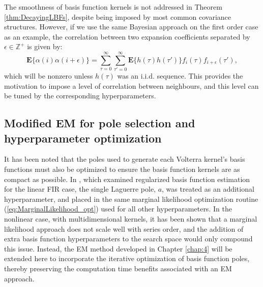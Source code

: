 \begin{rem}
The smoothness of basis function kernels is not addressed in Theorem \ref{thm:DecayingLBFs}, despite being imposed by most common covariance structures. However, if we use the same Bayesian approach on the first order case as an example, the correlation between two expansion coefficients separated by $\epsilon \in \mathbb{Z}^+$ is given by:
$$\textbf{E}\{ \alpha(i) \alpha(i+\epsilon) \} = \sum_{\tau = 0}^{\infty} \sum_{\tau' = 0}^{\infty} \textbf{E}\{h(\tau)h(\tau')\} f_i(\tau) f_{i+\epsilon}(\tau'),$$
which will be nonzero unless $h(\tau)$ was an i.i.d. sequence. This provides the motivation to impose a level of correlation between neighbours, and this level can be tuned by the corresponding hyperparameters.  
\end{rem}

\subsection{Modified EM for pole selection and hyperparameter optimization}

It has been noted that the poles used to generate each Volterra kernel's basis functions must also be optimized to ensure the basis function kernels are as compact as possible. In \cite{Chen2015}, which examined regularized basis function estimation for the linear FIR case, the single Laguerre pole, $a$, was treated as an additional hyperparameter, and placed in the same marginal likelihood optimization routine (\ref{eq:MarginalLikelihood_opt}) used for all other hyperparameters. In the nonlinear case, with multidimensional kernels, it has been shown that a marginal likelihood approach does not scale well with series order, and the addition of extra basis function hyperparameters to the search space would only compound this issue. Instead, the EM method developed in Chapter \ref{chap:4} will be extended here to incorporate the iterative optimization of basis function poles, thereby preserving the computation time benefits associated with an EM approach. 

